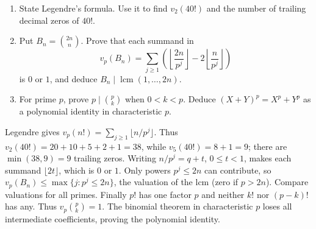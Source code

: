 \begin{enumerate}
\item State Legendre's formula. Use it to find $v_2(40!)$ and the
number of trailing decimal zeros of $40!$. 
\item Put $B_n=\binom{2n}{n}$. Prove that each summand in
\[
v_p(B_n)=\sum_{j\ge1}\left(
\left\lfloor\frac{2n}{p^j}\right\rfloor-
2\left\lfloor\frac{n}{p^j}\right\rfloor\right)
\]
is $0$ or $1$, and deduce $B_n\mid\operatorname{lcm}(1,\ldots,2n)$.
\item For prime $p$, prove $p\mid\binom pk$ when $0<k<p$.
Deduce $(X+Y)^p=X^p+Y^p$ as a polynomial identity in characteristic $p$.
\end{enumerate}
\begin{solution}
Legendre gives $v_p(n!)=\sum_{j\ge1}\lfloor n/p^j\rfloor$.
Thus $v_2(40!)=20+10+5+2+1=38$, while $v_5(40!)=8+1=9$;
there are $\min(38,9)=9$ trailing zeros.
Writing $n/p^j=q+t$, $0\le t<1$, makes each summand $\lfloor2t\rfloor$,
which is $0$ or $1$. Only powers $p^j\le2n$ can contribute, so
$v_p(B_n)\le\max\{j:p^j\le2n\}$, the valuation of the lcm (zero
if $p>2n$). Compare valuations for all primes.
Finally $p!$ has one factor $p$ and neither $k!$ nor $(p-k)!$ has any.
Thus $v_p\binom pk=1$. The binomial theorem in characteristic $p$
loses all intermediate coefficients, proving the polynomial identity.
\end{solution}

